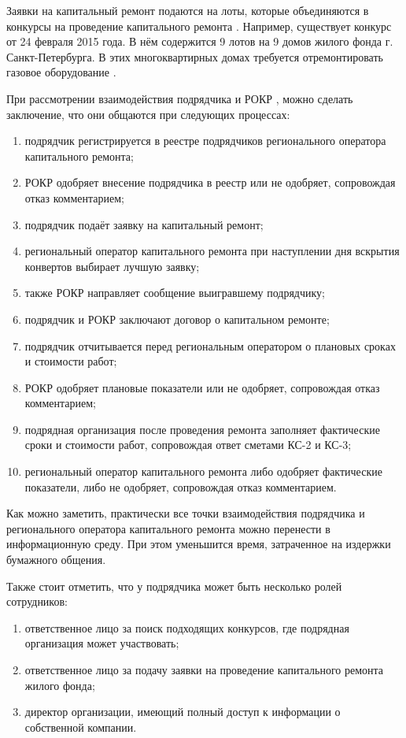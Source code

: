 Заявки на капитальный ремонт подаются на лоты, которые объединяются в конкурсы на проведение капитального ремонта \cite{analog_spb}.
Например, существует конкурс от 24 февраля 2015 года. В нём содержится 9 лотов на 9 домов жилого фонда г. Санкт-Петербурга.
В этих многоквартирных домах требуется отремонтировать газовое оборудование \cite{analog_spb}.

При рассмотрении взаимодействия подрядчика и РОКР \cite{analog_msk}, можно сделать заключение, что они общаются при следующих процессах:

\begin{enumerate}
	\item подрядчик регистрируется в реестре подрядчиков регионального оператора капитального ремонта;
	\item РОКР одобряет внесение подрядчика в реестр или не одобряет, сопровождая отказ комментарием;
	\item подрядчик подаёт заявку на капитальный ремонт;
	\item региональный оператор капитального ремонта при наступлении дня вскрытия конвертов выбирает лучшую заявку;
	\item также РОКР направляет сообщение выигравшему подрядчику;
	\item подрядчик и РОКР заключают договор о капитальном ремонте;
	\item подрядчик отчитывается перед региональным оператором о плановых сроках и стоимости работ;
	\item РОКР одобряет плановые показатели или не одобряет, сопровождая отказ комментарием;
	\item подрядная организация после проведения ремонта заполняет фактические сроки и стоимости работ, сопровождая ответ сметами КС-2 и КС-3;
	\item региональный оператор капитального ремонта либо одобряет фактические показатели, либо не одобряет, сопровождая отказ комментарием.
\end{enumerate}

Как можно заметить, практически все точки взаимодействия подрядчика и регионального оператора капитального ремонта можно перенести в информационную среду.
При этом уменьшится время, затраченное на издержки бумажного общения.

Также стоит отметить, что у подрядчика может быть несколько ролей сотрудников:

\begin{enumerate}
	\item ответственное лицо за поиск подходящих конкурсов, где подрядная организация может участвовать;
	\item ответственное лицо за подачу заявки на проведение капитального ремонта жилого фонда;
	\item директор организации, имеющий полный доступ к информации о собственной компании.
\end{enumerate}

